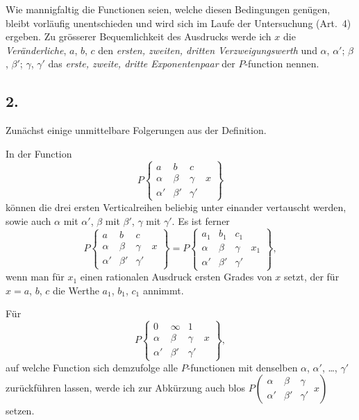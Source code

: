 \documentclass[12pt,a4paper]{book}
\theoremstyle{definition}
\theoremstyle{remark}
\begin{document}
Wie mannigfaltig die Functionen seien, welche diesen Bedingungen genügen, bleibt vorläufig unentschieden und wird sich im Laufe der Untersuchung (Art.~4) ergeben. Zu grösserer Bequemlichkeit des Ausdrucks werde ich $x$ die \textit{Veränderliche}, $a$, $b$, $c$ den \textit{ersten, zweiten, dritten Verzweigungswerth} und $\alpha$, $\alpha'$; $\beta$, $\beta'$; $\gamma$, $\gamma'$ das \textit{erste, zweite, dritte Exponentenpaar} der $P$-function nennen.

\subsection*{2.}

Zunächst einige unmittelbare Folgerungen aus der Definition.

In der Function
\[
P\left\{\begin{array}{ccc|c}
a & b & c & \\
\alpha & \beta & \gamma & x \\
\alpha' & \beta' & \gamma' &
\end{array}\right\}
\]
können die drei ersten Verticalreihen beliebig unter einander vertauscht werden, sowie auch $\alpha$ mit $\alpha'$, $\beta$ mit $\beta'$, $\gamma$ mit $\gamma'$. Es ist ferner
\[
P\left\{\begin{array}{ccc|c}
a & b & c & \\
\alpha & \beta & \gamma & x \\
\alpha' & \beta' & \gamma' &
\end{array}\right\}
= P\left\{\begin{array}{ccc|c}
a_1 & b_1 & c_1 & \\
\alpha & \beta & \gamma & x_1 \\
\alpha' & \beta' & \gamma' &
\end{array}\right\},
\]
wenn man für $x_1$ einen rationalen Ausdruck ersten Grades von $x$ setzt, der für $x = a$, $b$, $c$ die Werthe $a_1$, $b_1$, $c_1$ annimmt.

Für
\[
P\left\{\begin{array}{ccc|c}
0 & \infty & 1 & \\
\alpha & \beta & \gamma & x \\
\alpha' & \beta' & \gamma' &
\end{array}\right\},
\]
auf welche Function sich demzufolge alle $P$-functionen mit denselben $\alpha$, $\alpha'$, \dots, $\gamma'$ zurückführen lassen, werde ich zur Abkürzung auch blos $P\left(\begin{array}{ccc|} \alpha & \beta & \gamma \\ \alpha' & \beta' & \gamma' \end{array}\, x\right)$ setzen.
\end{document}
